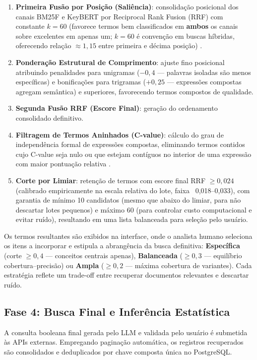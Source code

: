 \documentclass[12pt, a4paper]{article}
\begin{document}
\begin{enumerate}[label=\textbf{Passo \arabic*.}, leftmargin=2.2cm]
    \item \textbf{Primeira Fusão por Posição (Saliência)}: consolidação posicional dos canais BM25F e KeyBERT por Reciprocal Rank Fusion (RRF) com constante $k=60$ (favorece termos bem classificados em \textbf{ambos} os canais sobre excelentes em apenas um; $k=60$ é convenção em buscas híbridas, oferecendo relação $\approx 1{,}15$ entre primeira e décima posição) \cite{cormack2009}.
    \item \textbf{Ponderação Estrutural de Comprimento}: ajuste fino posicional atribuindo penalidades para unigramas ($-0{,}4$ — palavras isoladas são menos específicas) e bonificações para trigramas ($+0{,}25$ — expressões compostas agregam semântica) e superiores, favorecendo termos compostos de qualidade.
    \item \textbf{Segunda Fusão RRF (Escore Final)}: geração do ordenamento consolidado definitivo.
    \item \textbf{Filtragem de Termos Aninhados (C-value)}: cálculo do grau de independência formal de expressões compostas, eliminando termos contidos cujo C-value seja nulo ou que estejam contíguos no interior de uma expressão com maior pontuação relativa \cite{frantzi2000}.
    \item \textbf{Corte por Limiar}: retenção de termos com escore final RRF $\ge 0{,}024$ (calibrado empiricamente na escala relativa do lote, faixa ~0,018–0,033), com garantia de mínimo 10 candidatos (mesmo que abaixo do limiar, para não descartar lotes pequenos) e máximo 60 (para controlar custo computacional e evitar ruído), resultando em uma lista balanceada para seleção pelo usuário.
  \end{enumerate}

  Os termos resultantes são exibidos na interface, onde o analista humano seleciona os itens a incorporar e estipula a abrangência da busca definitiva: \textbf{Específica} (corte $\ge 0{,}4$ — conceitos centrais apenas), \textbf{Balanceada} ($\ge 0{,}3$ — equilíbrio cobertura–precisão) ou \textbf{Ampla} ($\ge 0{,}2$ — máxima cobertura de variantes). Cada estratégia reflete um trade-off entre recuperar documentos relevantes e descartar ruído.

  \subsection{Fase 4: Busca Final e Inferência Estatística}
  \label{sec:fase4}

  A consulta booleana final gerada pelo LLM e validada pelo usuário é submetida às APIs externas. Empregando paginação automática, os registros recuperados são consolidados e deduplicados por chave composta única no PostgreSQL.
\end{document}
